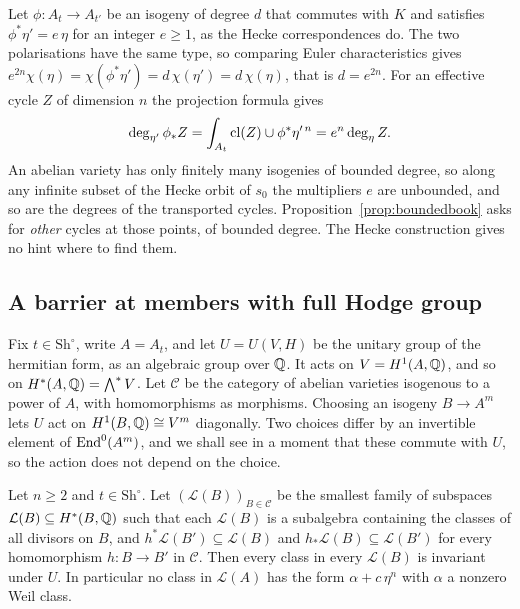 \begin{remark}\label{rem:heckebook}
Let $\phi\colon A_{t}\to A_{t'}$ be an isogeny of degree $d$ that commutes
with $K$ and satisfies $\phi^{*}\eta'=e\,\eta$ for an integer $e\ge1$, as
the Hecke correspondences do. The two polarisations have the same type, so
comparing Euler characteristics gives
$e^{2n}\chi(\eta)=\chi(\phi^{*}\eta')=d\,\chi(\eta')=d\,\chi(\eta)$, that is
$d=e^{2n}$. For an effective cycle $Z$ of dimension $n$ the projection
formula gives
\[
  \deg_{\eta'}\phi_{*}Z=\int_{A_{t}}\operatorname{cl}(Z)\cup\phi^{*}\eta'^{\,n}
  =e^{n}\deg_{\eta}Z .
\]
An abelian variety has only finitely many isogenies of bounded degree, so
along any infinite subset of the Hecke orbit of $s_{0}$ the multipliers $e$
are unbounded, and so are the degrees of the transported cycles.
Proposition~\ref{prop:boundedbook} asks for \emph{other} cycles at those
points, of bounded degree. The Hecke construction gives no hint where to
find them.
\end{remark}

\subsection{A barrier at members with full Hodge group}

Fix $t\in\mathrm{Sh}^{\circ}$, write $A=A_{t}$, and let $U=U(V,H)$ be the unitary
group of the hermitian form, as an algebraic group over $\mathbb{Q}$. It acts on
$V=H^{1}(A,\mathbb{Q})$, and so on $H^{*}(A,\mathbb{Q})=\bigwedge^{*}V$. Let $\mathcal C$
be the category of abelian varieties isogenous to a power of $A$, with
homomorphisms as morphisms. Choosing an isogeny $B\to A^{m}$ lets $U$ act on
$H^{1}(B,\mathbb{Q})\cong V^{m}$ diagonally. Two choices differ by an invertible
element of $\operatorname{End}^{0}(A^{m})$, and we shall see in a moment that these
commute with $U$, so the action does not depend on the choice.

\begin{theorem}\label{thm:barrierbook}
Let $n\ge2$ and $t\in\mathrm{Sh}^{\circ}$. Let $(\mathcal L(B))_{B\in\mathcal C}$ be
the smallest family of subspaces $\mathcal L(B)\subseteq H^{*}(B,\mathbb{Q})$
such that each $\mathcal L(B)$ is a subalgebra containing the classes of all
divisors on $B$, and $h^{*}\mathcal L(B')\subseteq\mathcal L(B)$ and
$h_{*}\mathcal L(B)\subseteq\mathcal L(B')$ for every homomorphism
$h\colon B\to B'$ in $\mathcal C$. Then every class in every $\mathcal L(B)$
is invariant under $U$. In particular no class in $\mathcal L(A)$ has the
form $\alpha+c\,\eta^{n}$ with $\alpha$ a nonzero Weil class.
\end{theorem}

